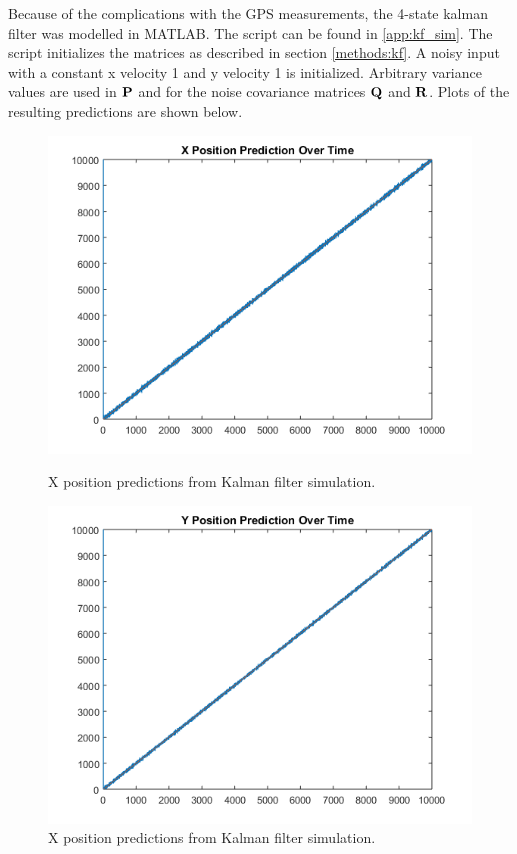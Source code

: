 Because of the complications with the GPS measurements, the 4-state kalman filter
was modelled in MATLAB. The script can be found in \ref{app:kf_sim}. The script 
initializes the matrices as described in section \ref{methods:kf}. A noisy input
with a constant x velocity 1 and y velocity 1 is initialized. Arbitrary variance
values are used in $\mathbf{P}$ and for the noise covariance matrices $\mathbf{Q}$
and $\mathbf{R}$. Plots of the resulting predictions are shown below. 
\begin{figure}[ht!]
\begin{minipage}{.5\textwidth}
  \centering
\includegraphics[scale=0.5]{img/kf_xpos.png}
\caption{X position predictions from Kalman filter simulation.}
\label{fig:kf_xpos}
\end{minipage}
\begin{minipage}{0.5\textwidth}
\centering
\includegraphics[scale=0.5]{img/kf_ypos.png}
\caption{X position predictions from Kalman filter simulation.}
\label{fig:kf_ypos}
\end{minipage}
\end{figure}
